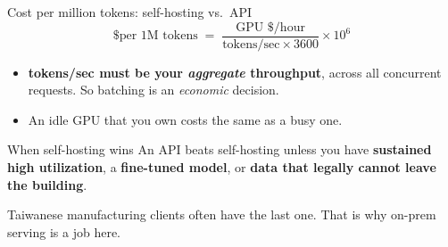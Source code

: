 \documentclass[aspectratio=169,10pt]{beamer}
\newcommand{\warnc}[1]{\textcolor{warn}{\textbf{#1}}}
\begin{document}
\begin{frame}{Cost per million tokens: self-hosting vs.\ API}
  \begin{equation*}
    \text{\$ per 1M tokens}
      \;=\;
      \frac{\text{GPU \$/hour}}{\text{tokens/sec} \times 3600}
      \times 10^{6}
  \end{equation*}
  \vspace{0.4em}
  \begin{itemize}
    \item \warnc{tokens/sec must be your \emph{aggregate} throughput}, across
          all concurrent requests. So batching is an \emph{economic} decision.
    \item An idle GPU that you own costs the same as a busy one.
  \end{itemize}
  \vspace{0.4em}
  \begin{center}
    \begin{minipage}{0.9\textwidth}
      \begin{block}{When self-hosting wins}
        \small
        An API beats self-hosting unless you have
        \textbf{sustained high utilization}, a \textbf{fine-tuned model}, or
        \textbf{data that legally cannot leave the building}.

        \vspace{0.2em}
        Taiwanese manufacturing clients often have the last one. That is
        why on-prem serving is a job here.
      \end{block}
    \end{minipage}
  \end{center}
\end{frame}
\end{document}
